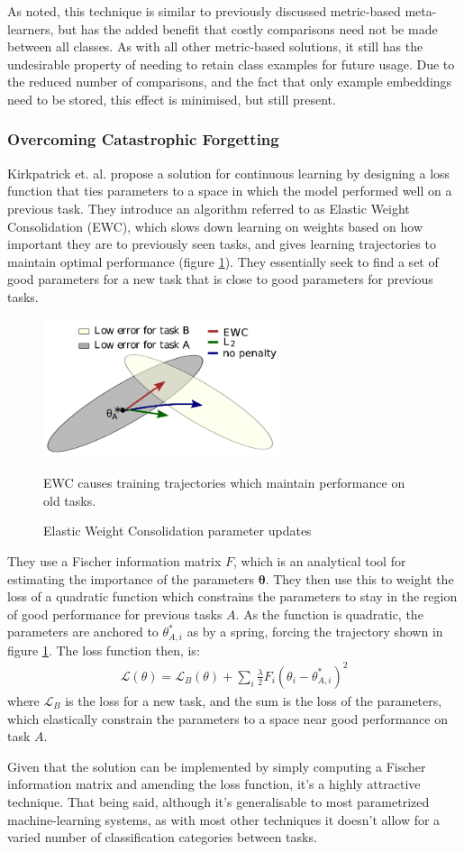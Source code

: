 \documentclass{report}
\begin{document}
As noted, this technique is similar to previously discussed metric-based meta-learners, but has the added benefit that costly comparisons need not be made between all classes. As with all other metric-based solutions, it still has the undesirable property of needing to retain class examples for future usage. Due to the reduced number of comparisons, and the fact that only example embeddings need to be stored, this effect is minimised, but still present.

\subsubsection{Overcoming Catastrophic Forgetting}
Kirkpatrick et. al. \parencite{ewc} propose a solution for continuous learning by designing a loss function that ties parameters to a space in which the model performed well on a previous task. They introduce an algorithm referred to as Elastic Weight Consolidation (EWC), which slows down learning on weights based on how important they are to previously seen tasks, and gives learning trajectories to maintain optimal performance (figure \ref{fig:ewc:1}). They essentially seek to find a set of good parameters for a new task that is close to good parameters for previous tasks. \par
\begin{figure}[h]
 \centering
 \includegraphics[width=7cm]{ewc}
 \caption{Elastic Weight Consolidation parameter updates}
 EWC causes training trajectories which maintain performance on old tasks.
 \label{fig:ewc:1}
\end{figure}
They use a Fischer information matrix $F$, which is an analytical tool for estimating the importance of the parameters $\bm{\theta}$. They then use this to weight the loss of a quadratic function which constrains the parameters to stay in the region of good performance for previous tasks $A$. As the function is quadratic, the parameters are anchored to $\theta_{A,i}^*$ as by a spring, forcing the trajectory shown in figure \ref{fig:ewc:1}. The loss function then, is:
\begin{align}
 \mathcal{L}(\theta) = \mathcal{L}_B(\theta) + \sum_{i} \frac{\lambda}{2} F_i (\theta_i - \theta_{A,i}^*)^2
\end{align}
where $\mathcal{L}_B$ is the loss for a new task, and the sum is the loss of the parameters, which elastically constrain the parameters to a space near good performance on task $A$. \par
Given that the solution can be implemented by simply computing a Fischer information matrix and amending the loss function, it's a highly attractive technique. That being said, although it's generalisable to most parametrized machine-learning systems, as with most other techniques it doesn't allow for a varied number of classification categories between tasks.
\end{document}
